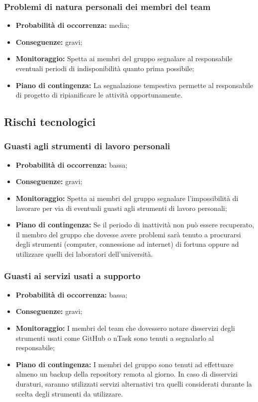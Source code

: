 \subsubsection{Problemi di natura personali dei membri del team}
\begin{itemize}
\item \textbf{Probabilità di occorrenza:} media;
\item \textbf{Conseguenze:} gravi;
\item \textbf{Monitoraggio:} Spetta ai membri del gruppo segnalare al responsabile eventuali periodi di indisponibilità quanto prima possibile;
\item \textbf{Piano di contingenza:} La segnalazione tempestiva permette al responsabile di progetto di ripianificare le attività opportunamente.
\end{itemize}
\subsection{Rischi tecnologici}
\subsubsection{Guasti agli strumenti di lavoro personali}
\begin{itemize}
\item \textbf{Probabilità di occorrenza:} bassa;
\item \textbf{Conseguenze:} gravi;
\item \textbf{Monitoraggio:} Spetta ai membri del gruppo segnalare l'impossibilità di lavorare per via di eventuali guasti agli strumenti di lavoro personali;
\item \textbf{Piano di contingenza:} Se il periodo di inattività non può essere recuperato, il membro del gruppo che dovesse avere problemi sarà tenuto a procurarsi degli strumenti (computer, connessione ad internet) di fortuna oppure ad utilizzare quelli dei laboratori dell'università.
\end{itemize}
\subsubsection{Guasti ai servizi usati a supporto}
\begin{itemize}
\item \textbf{Probabilità di occorrenza:} bassa;
\item \textbf{Conseguenze:} gravi;
\item \textbf{Monitoraggio:} I membri del team che dovessero notare disservizi degli strumenti usati come GitHub o nTask sono tenuti a segnalarlo al responsabile;
\item \textbf{Piano di contingenza:} I membri del gruppo sono tenuti ad effettuare almeno un backup della repository remota al giorno. In caso di disservizi duraturi, saranno utilizzati servizi alternativi tra quelli considerati	durante la scelta degli strumenti da utilizzare.
\end{itemize}
